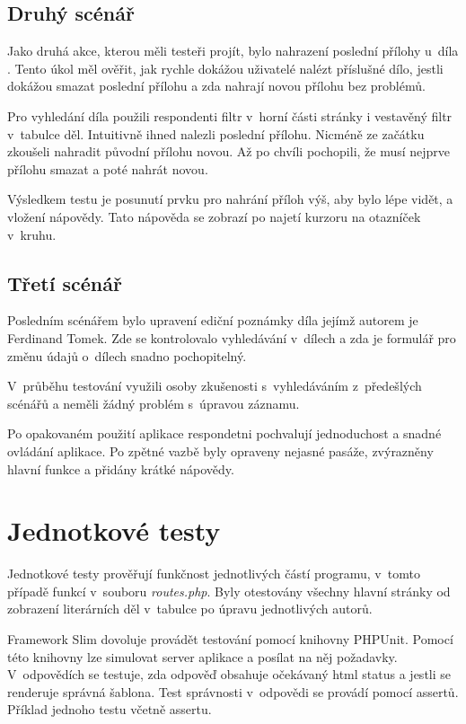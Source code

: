         \subsection{Druhý scénář}
            Jako druhá akce, kterou měli testeři projít, bylo nahrazení poslední přílohy u~díla . Tento úkol měl ověřit, jak rychle dokážou uživatelé nalézt příslušné dílo, jestli dokážou smazat poslední přílohu a zda nahrají novou přílohu bez problémů.
            
            Pro vyhledání díla použili respondenti filtr v~horní části stránky i vestavěný filtr v~tabulce děl. Intuitivně ihned nalezli poslední přílohu. Nicméně ze začátku zkoušeli nahradit původní přílohu novou. Až po chvíli pochopili, že musí nejprve přílohu smazat a poté nahrát novou.

            Výsledkem testu je posunutí prvku pro nahrání příloh výš, aby bylo lépe vidět, a vložení nápovědy. Tato nápověda se zobrazí po najetí kurzoru na otazníček v~kruhu.

        \subsection{Třetí scénář}
            Posledním scénářem bylo upravení ediční poznámky díla jejímž autorem je Ferdinand Tomek. Zde se kontrolovalo vyhledávání v~dílech a zda je formulář pro změnu údajů o~dílech snadno pochopitelný.
            
            V~průběhu testování využili osoby zkušenosti s~vyhledáváním z~předešlých scénářů a neměli žádný problém s~úpravou záznamu. 
            
            Po opakovaném použití aplikace respondetni pochvalují jednoduchost a snadné ovládání aplikace. Po zpětné vazbě byly opraveny nejasné pasáže, zvýrazněny hlavní funkce a přidány krátké nápovědy.

    \section{Jednotkové testy}
        Jednotkové testy prověřují funkčnost jednotlivých částí programu, v~tomto případě funkcí v~souboru \textit{routes.php}. Byly otestovány všechny hlavní stránky od zobrazení literárních děl v~tabulce po úpravu jednotlivých autorů.
        
        Framework Slim dovoluje provádět testování pomocí knihovny PHPUnit. Pomocí této knihovny lze simulovat server aplikace a posílat na něj požadavky. V~odpovědích se testuje, zda odpověď obsahuje očekávaný html status a jestli se renderuje správná šablona. Test správnosti v~odpovědi se provádí pomocí assertů. Příklad jednoho testu včetně assertu.
        
